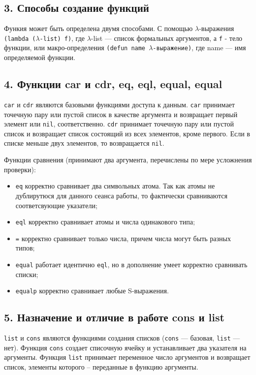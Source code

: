 \subsection*{3. Способы создание функций}

Функия может быть определена двумя способами. С помощью $\lambda$-выражения
\verb|(lambda (|$\lambda$\verb|-list) f)|, где $\lambda$-list --- список
формальных аргументов, а \verb|f| - тело функции, или макро-определения
\verb|(defun name |$\lambda$\verb|-выражение)|, где name --- имя определяемой
функции.

\subsection*{4. Функции car и cdr, eq, eql, equal, equal}

\verb|car| и \verb|cdr| являются базовыми функциями доступа к данным.
\verb|car| принимает точечную пару или пустой список в качестве аргумента и
возвращает первый элемент или \verb|nil|, соответственно. \verb|cdr| принимает
точечную  пару или пустой список и возвращает список состоящий из всех
элементов, кроме первого. Если в списке меньше двух элементов, то возвращается
\verb|nil|.

Функции сравнения (принимают два аргумента, перечислены по мере усложнения
проверки):
\begin{itemize}
    \item \verb|eq| корректно сравнивает два символьных атома. Так как атомы не
          дублирутюся для данного сеанса работы, то фактически сравниваются
          соответсвующие указатели;
    \item \verb|eql| корректно сравнивает атомы и числа одинакового типа;
    \item \verb|=| корректно сравнивает только числа, причем числа могут быть
          разных типов;
    \item \verb|equal| работает идентично \verb|eql|, но в дополнение умеет
          корректно сравнивать списки;
    \item \verb|equalp| корректно сравнивает любые S-выражения. 
\end{itemize}

\subsection*{5. Назначение и отличие в работе cons и list}

\verb|list| и \verb|cons| являются функциями создания списков (\verb|cons| ---
базовая, \verb|list| --- нет). Функция \verb|cons| создает списочную  ячейку  и
устанавливает два указателя на аргументы. Функция \verb|list| принимает
переменное число аргументов и возвращает список, элементы которого – переданные
в функцию аргументы.

